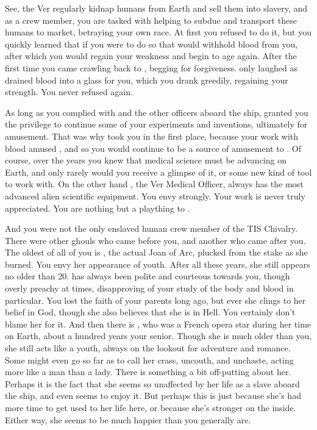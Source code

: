 \documentclass[char]{guildcamp4}
\begin{document}
See, the Ver regularly kidnap humans from Earth and sell them into slavery, and as a crew member, you are tasked with helping to subdue and transport these humans to market, betraying your own race. At first you refused to do it, but you quickly learned that if you were to do so that \cVone{} would withhold \cVone{\their} blood from you, after which you would regain your weakness and begin to age again. After the first time you came crawling back to \cVone{}, begging for forgiveness. \cVone{} only laughed as \cVone{\they} drained \cVone{\their} blood into a glass for you, which you drank greedily, regaining your strength. You never refused again.

As long as you complied with \cVone{} and the other officers aboard the ship, \cVone{} granted you the privilege to continue some of your experiments and inventions, ultimately for \cVone{\their} amusement. That was why \cVone{\they} took you in the first place, because your work with blood amused \cVone{\them}, and so you would continue to be a source of amusement to \cVone{\them}. Of course, over the years you knew that medical science must be advancing on Earth, and only rarely would you receive a glimpse of it, or some new kind of tool to work with. On the other hand \cVthree{}, the Ver Medical Officer, always has the most advanced alien scientific equipment. You envy \cVthree{\them} strongly. Your work is never truly appreciated. You are nothing but a plaything to \cVone{}.

And you were not the only enslaved human crew member of the TIS Chivalry. There were other ghouls who came before you, and another who came after you. The oldest of all of you is \cJoan{}, the actual Joan of Arc, plucked from the stake as she burned. You envy her appearance of youth. After all these years, she still appears no older than 20. \cJoan{} has always been polite and courteous towards you, though overly preachy at times, disapproving of your study of the body and blood in particular. You lost the faith of your parents long ago, but ever she clings to her belief in God, though she also believes that she is in Hell. You certainly don't blame her for it. And then there is \cJulie{}, who was a French opera star during her time on Earth, about a hundred years your senior. Though she is much older than you, she still acts like a youth, always on the lookout for adventure and romance. Some might even go so far as to call her crass, uncouth, and unchaste, acting more like a man than a lady. There is something a bit off-putting about her. Perhaps it is the fact that she seems so unaffected by her life as a slave aboard the ship, and even seems to enjoy it. But perhaps this is just because she's had more time to get used to her life here, or because she's stronger on the inside. Either way, she seems to be much happier than you generally are.
\end{document}
